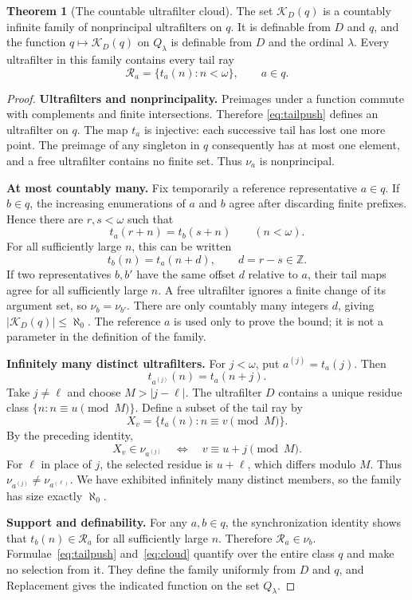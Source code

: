 \documentclass[11pt,letterpaper]{article}
\theoremstyle{definition}
\newtheorem{theorem}[definition]{Theorem}
\numberwithin{equation}{section}
\begin{document}
\begin{theorem}[The countable ultrafilter cloud]\label{thm:cloud}
The set $\mathcal K_D(q)$ is a countably infinite family of nonprincipal ultrafilters on $q$. It is definable from $D$ and $q$, and the function $q\mapsto\mathcal K_D(q)$ on $Q_\lambda$ is definable from $D$ and the ordinal $\lambda$. Every ultrafilter in this family contains every tail ray
\[
 \mathcal R_a=\{t_a(n):n<\omega\},\qquad a\in q.
\]
\end{theorem}
\begin{proof}
\textbf{Ultrafilters and nonprincipality.}
Preimages under a function commute with complements and finite intersections. Therefore \eqref{eq:tailpush} defines an ultrafilter on $q$. The map $t_a$ is injective: each successive tail has lost one more point. The preimage of any singleton in $q$ consequently has at most one element, and a free ultrafilter contains no finite set. Thus $\nu_a$ is nonprincipal.

\textbf{At most countably many.}
Fix temporarily a reference representative $a\in q$. If $b\in q$, the increasing enumerations of $a$ and $b$ agree after discarding finite prefixes. Hence there are $r,s<\omega$ such that
\[
 t_a(r+n)=t_b(s+n)\qquad(n<\omega).
\]
For all sufficiently large $n$, this can be written
\[
 t_b(n)=t_a(n+d),\qquad d=r-s\in\mathbb Z.
\]
If two representatives $b,b'$ have the same offset $d$ relative to $a$, their tail maps agree for all sufficiently large $n$. A free ultrafilter ignores a finite change of its argument set, so $\nu_b=\nu_{b'}$. There are only countably many integers $d$, giving $|\mathcal K_D(q)|\le\aleph_0$. The reference $a$ is used only to prove the bound; it is not a parameter in the definition of the family.

\textbf{Infinitely many distinct ultrafilters.}
For $j<\omega$, put $a^{(j)}=t_a(j)$. Then
\[
 t_{a^{(j)}}(n)=t_a(n+j).
\]
Take $j\ne\ell$ and choose $M>|j-\ell|$. The ultrafilter $D$ contains a unique residue class $\{n:n\equiv u\pmod M\}$. Define a subset of the tail ray by
\[
 X_v=\{t_a(n):n\equiv v\pmod M\}.
\]
By the preceding identity,
\[
 X_v\in\nu_{a^{(j)}}\quad\Longleftrightarrow\quad v\equiv u+j\pmod M.
\]
For $\ell$ in place of $j$, the selected residue is $u+\ell$, which differs modulo $M$. Thus $\nu_{a^{(j)}}\ne\nu_{a^{(\ell)}}$. We have exhibited infinitely many distinct members, so the family has size exactly $\aleph_0$.

\textbf{Support and definability.}
For any $a,b\in q$, the synchronization identity shows that $t_b(n)\in\mathcal R_a$ for all sufficiently large $n$. Therefore $\mathcal R_a\in\nu_b$. Formulae~\eqref{eq:tailpush} and~\eqref{eq:cloud} quantify over the entire class $q$ and make no selection from it. They define the family uniformly from $D$ and $q$, and Replacement gives the indicated function on the set $Q_\lambda$.
\end{proof}
\end{document}
